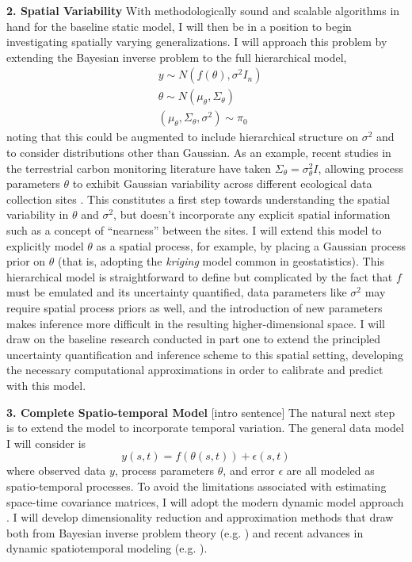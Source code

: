 \documentclass[12pt]{article}
\begin{document}
 \textbf{2. Spatial Variability} With methodologically sound and scalable algorithms in hand for the baseline static model, I will then be in a position to begin investigating spatially varying generalizations. I will approach this problem by extending the Bayesian inverse problem to the full hierarchical model,
\begin{align*}
&y \sim N(f(\theta), \sigma^2 I_n) \\
&\theta \sim N(\mu_\theta, \Sigma_\theta) \\
&(\mu_\theta, \Sigma_\theta, \sigma^2) \sim \pi_0
\end{align*}
noting that this could be augmented to include hierarchical structure on $\sigma^2$ and to consider distributions other than Gaussian. As an example, recent studies in the terrestrial 
carbon monitoring literature have taken $\Sigma_\theta = \sigma^2_\theta I$, allowing process parameters $\theta$ to exhibit Gaussian variability across different ecological data collection
sites \cite{Fer2}. This constitutes a first step towards understanding the spatial variability in $\theta$ and $\sigma^2$, but doesn't incorporate any explicit spatial information such as a concept of ``nearness'' between the sites. I will extend this model to explicitly model $\theta$ as a spatial process, for example, by placing a Gaussian process prior on $\theta$ (that is, adopting the 
\textit{kriging} model common in geostatistics). This hierarchical model is straightforward to define
 but complicated by the fact that $f$ must be emulated and its uncertainty quantified, data parameters like $\sigma^2$ may require spatial process priors as well,
and the introduction of new parameters makes inference more difficult in the resulting higher-dimensional space.  I will draw on the baseline research conducted in part one to extend the principled uncertainty quantification and inference scheme to this spatial setting, developing the necessary computational approximations in order to calibrate and predict with this model. 
 
  \textbf{3. Complete Spatio-temporal Model}
  [intro sentence] The natural next step is to extend the model to incorporate temporal variation. The general data model I will consider is 
  \[y(s, t) = f(\theta(s, t)) + \epsilon(s, t)\]
  where observed data $y$, process parameters $\theta$, and error $\epsilon$ are all modeled as spatio-temporal processes. 
  To avoid the limitations associated with estimating space-time covariance matrices, I will adopt the modern dynamic model approach \cite{Arab}. I will develop dimensionality 
  reduction and approximation methods that draw both from Bayesian inverse problem theory (e.g. \cite{Kugler}) and recent advances in 
  dynamic spatiotemporal modeling (e.g. \cite{Hefley}). 
 
\end{document}
